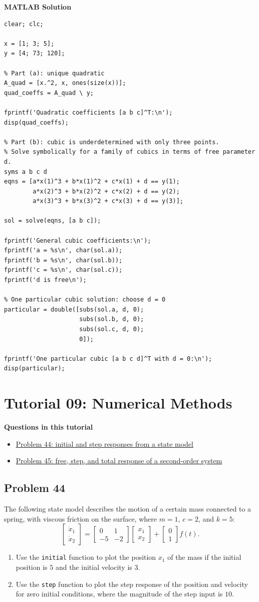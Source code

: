 \documentclass[12pt]{article}
\newcommand{\tutorialsection}[2]{%
    \clearpage
    \phantomsection
    \hypertarget{#1}{}%
    \section*{#2}
}
\newcommand{\questiontitle}[2]{%
    \phantomsection
    \hypertarget{#1}{}%
    \subsection*{#2}
}
\newcommand{\solutiontitle}{\noindent\textbf{MATLAB Solution}}
\newcommand{\minitoc}[1]{%
    \noindent\textbf{Questions in this tutorial}
    \begin{itemize}[leftmargin=1.5em, itemsep=0.2em]
        #1
    \end{itemize}
}
\begin{document}
\solutiontitle
\begin{lstlisting}
clear; clc;

x = [1; 3; 5];
y = [4; 73; 120];

% Part (a): unique quadratic
A_quad = [x.^2, x, ones(size(x))];
quad_coeffs = A_quad \ y;

fprintf('Quadratic coefficients [a b c]^T:\n');
disp(quad_coeffs);

% Part (b): cubic is underdetermined with only three points.
% Solve symbolically for a family of cubics in terms of free parameter d.
syms a b c d
eqns = [a*x(1)^3 + b*x(1)^2 + c*x(1) + d == y(1);
        a*x(2)^3 + b*x(2)^2 + c*x(2) + d == y(2);
        a*x(3)^3 + b*x(3)^2 + c*x(3) + d == y(3)];

sol = solve(eqns, [a b c]);

fprintf('General cubic coefficients:\n');
fprintf('a = %s\n', char(sol.a));
fprintf('b = %s\n', char(sol.b));
fprintf('c = %s\n', char(sol.c));
fprintf('d is free\n');

% One particular cubic solution: choose d = 0
particular = double([subs(sol.a, d, 0);
                     subs(sol.b, d, 0);
                     subs(sol.c, d, 0);
                     0]);

fprintf('One particular cubic [a b c d]^T with d = 0:\n');
disp(particular);
\end{lstlisting}

\tutorialsection{tut9}{Tutorial 09: Numerical Methods}
\minitoc{
    \item \hyperlink{tut9-q44}{Problem 44: initial and step responses from a state model}
    \item \hyperlink{tut9-q45}{Problem 45: free, step, and total response of a second-order system}
}

\questiontitle{tut9-q44}{Problem 44}
The following state model describes the motion of a certain mass connected to a spring, with viscous friction on the surface, where $m = 1$, $c = 2$, and $k = 5$:
\[
\begin{bmatrix}
\dot{x}_{1} \\
\dot{x}_{2}
\end{bmatrix}
=
\begin{bmatrix}
0 & 1 \\
-5 & -2
\end{bmatrix}
\begin{bmatrix}
x_{1} \\
x_{2}
\end{bmatrix}
+
\begin{bmatrix}
0 \\
1
\end{bmatrix}
f(t).
\]
\begin{enumerate}[label=\alph*.]
    \item Use the \texttt{initial} function to plot the position $x_{1}$ of the mass if the initial position is $5$ and the initial velocity is $3$.
    \item Use the \texttt{step} function to plot the step response of the position and velocity for zero initial conditions, where the magnitude of the step input is $10$.
\end{enumerate}
\end{document}
